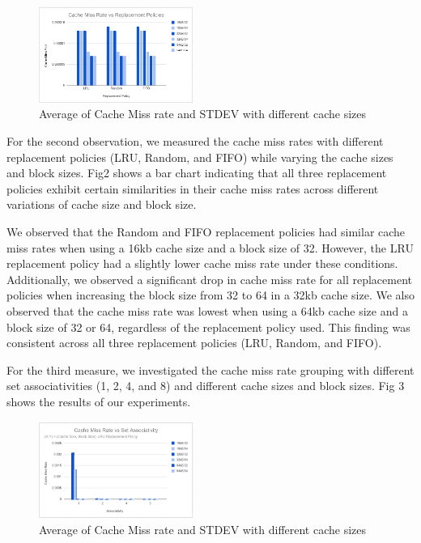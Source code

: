 \documentclass[conference]{IEEEtran}
\begin{document}
\space

\begin{figure}[H]
    \centering
    \includegraphics[width=0.45\textwidth]{sha/sha_cache_vs_repl.png}
    \caption{Average of Cache Miss rate and STDEV with different cache sizes}
\end{figure}

For the second observation, we measured the cache miss rates with different replacement policies (LRU, Random, and FIFO) while varying the cache sizes and block sizes. Fig2 shows a bar chart indicating that all three replacement policies exhibit certain similarities in their cache miss rates across different variations of cache size and block size.


We observed that the Random and FIFO replacement policies had similar cache miss rates when using a 16kb cache size and a block size of 32. However, the LRU replacement policy had a slightly lower cache miss rate under these conditions. Additionally, we observed a significant drop in cache miss rate for all replacement policies when increasing the block size from 32 to 64 in a 32kb cache size. We also observed that the cache miss rate was lowest when using a 64kb cache size and a block size of 32 or 64, regardless of the replacement policy used. This finding was consistent across all three replacement policies (LRU, Random, and FIFO).


For the third measure, we investigated the cache miss rate grouping with different set associativities (1, 2, 4, and 8) and different cache sizes and block sizes. Fig 3 shows the results of our experiments.

\begin{figure}[H]
    \centering
    \includegraphics[width=0.45\textwidth]{sha/sha_cache_vs_setAssoc.png}
    \caption{Average of Cache Miss rate and STDEV with different cache sizes}
\end{figure}
\end{document}
